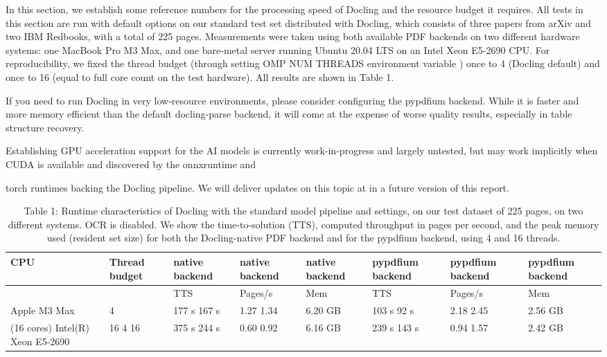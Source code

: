 \documentclass[11pt,a4paper]{article}
\begin{document}
In this section, we establish some reference numbers for the processing speed of Docling and the resource budget it requires. All tests in this section are run with default options on our standard test set distributed with Docling, which consists of three papers from arXiv and two IBM Redbooks, with a total of 225 pages. Measurements were taken using both available PDF backends on two different hardware systems: one MacBook Pro M3 Max, and one bare-metal server running Ubuntu 20.04 LTS on an Intel Xeon E5-2690 CPU. For reproducibility, we fixed the thread budget (through setting OMP NUM THREADS environment variable ) once to 4 (Docling default) and once to 16 (equal to full core count on the test hardware). All results are shown in Table 1.

If you need to run Docling in very low-resource environments, please consider configuring the pypdfium backend. While it is faster and more memory efficient than the default docling-parse backend, it will come at the expense of worse quality results, especially in table structure recovery.

Establishing GPU acceleration support for the AI models is currently work-in-progress and largely untested, but may work implicitly when CUDA is available and discovered by the onnxruntime and

torch runtimes backing the Docling pipeline. We will deliver updates on this topic at in a future version of this report.


\begin{table}[h]
\caption{Table 1: Runtime characteristics of Docling with the standard model pipeline and settings, on our test dataset of 225 pages, on two different systems. OCR is disabled. We show the time-to-solution (TTS), computed throughput in pages per second, and the peak memory used (resident set size) for both the Docling-native PDF backend and for the pypdfium backend, using 4 and 16 threads.}
\begin{tabular}{|l|l|l|l|l|l|l|l|}
\hline
CPU & Thread budget & native backend & native backend & native backend & pypdfium backend & pypdfium backend & pypdfium backend \\ \hline
 &  & TTS & Pages/s & Mem & TTS & Pages/s & Mem \\ \hline
Apple M3 Max & 4 & 177 s 167 s & 1.27 1.34 & 6.20 GB & 103 s 92 s & 2.18 2.45 & 2.56 GB \\ \hline
(16 cores) Intel(R) Xeon E5-2690 & 16 4 16 & 375 s 244 s & 0.60 0.92 & 6.16 GB & 239 s 143 s & 0.94 1.57 & 2.42 GB \\ \hline
\end{tabular}
\end{table}
\end{document}
